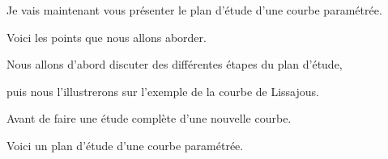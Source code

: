 






\debuttexte


\diapo

Je vais maintenant vous présenter le plan d'étude 
d'une courbe paramétrée.


\change

Voici les points que nous allons aborder.

\change

Nous allons d'abord discuter des différentes étapes du plan d'étude, 

\change

puis nous l'illustrerons sur l'exemple de la courbe de Lissajous.

\change

Avant de faire une étude complète d'une nouvelle courbe.


\diapo

Voici un plan d'étude d'une courbe paramétrée.

